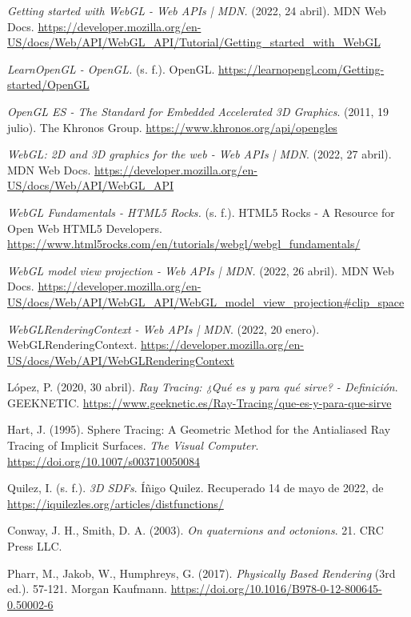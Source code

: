 \begin{thebibliography}{99}
 \textit{Getting started with WebGL - Web APIs | MDN.} (2022, 24 abril). MDN Web Docs. \url{https://developer.mozilla.org/en-US/docs/Web/API/WebGL_API/Tutorial/Getting_started_with_WebGL}

 \textit{LearnOpenGL - OpenGL.} (s. f.). OpenGL. \url{https://learnopengl.com/Getting-started/OpenGL}

 \textit{OpenGL ES - The Standard for Embedded Accelerated 3D Graphics}. (2011, 19 julio). The Khronos Group. \url{https://www.khronos.org/api/opengles}

 \textit{WebGL: 2D and 3D graphics for the web - Web APIs | MDN}. (2022, 27 abril). MDN Web Docs. \url{https://developer.mozilla.org/en-US/docs/Web/API/WebGL_API}

 \textit{WebGL Fundamentals - HTML5 Rocks.} (s. f.). HTML5 Rocks - A Resource for Open Web HTML5 Developers. \url{https://www.html5rocks.com/en/tutorials/webgl/webgl_fundamentals/}

 \textit{WebGL model view projection - Web APIs | MDN.} (2022, 26 abril). MDN Web Docs. \url{https://developer.mozilla.org/en-US/docs/Web/API/WebGL_API/WebGL_model_view_projection#clip_space}

 \textit{WebGLRenderingContext - Web APIs | MDN}. (2022, 20 enero). WebGLRenderingContext. \url{https://developer.mozilla.org/en-US/docs/Web/API/WebGLRenderingContext}

 López, P. (2020, 30 abril). \textit{Ray Tracing: ¿Qué es y para qué sirve? - Definición}. GEEKNETIC. \url{https://www.geeknetic.es/Ray-Tracing/que-es-y-para-que-sirve}

 Hart, J. (1995). Sphere Tracing: A Geometric Method for the Antialiased Ray Tracing of Implicit Surfaces. \textit{The Visual Computer}. \url{https://doi.org/10.1007/s003710050084}

 Quilez, I. (s. f.). \textit{3D SDFs}. Íñigo Quilez. Recuperado 14 de mayo de 2022, de \url{https://iquilezles.org/articles/distfunctions/}

 Conway, J. H., Smith, D. A. (2003). \textit{On quaternions and octonions}. 21. CRC Press LLC.

 Pharr, M., Jakob, W., Humphreys, G. (2017). \textit{Physically Based Rendering} (3rd ed.). 57-121. Morgan Kaufmann. \url{https://doi.org/10.1016/B978-0-12-800645-0.50002-6} 


\end{thebibliography}
